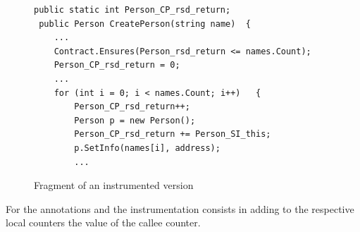 
% 
% 
% 
\begin{figure}[b]
 \begin{scriptsize}
 \begin{lstlisting}[numbers=none]
 public static int Person_CP_rsd_return;
 public Person CreatePerson(string name)  {
 	...
	Contract.Ensures(Person_rsd_return <= names.Count);
 	Person_CP_rsd_return = 0;
 	...		
	for (int i = 0; i < names.Count; i++)	{
		Person_CP_rsd_return++;
		Person p = new Person();
		Person_CP_rsd_return += Person_SI_this;
		p.SetInfo(names[i], address);
		...
 \end{lstlisting}
 \end{scriptsize}
 \vspace{-.5em}
\caption{Fragment of an instrumented version} \label{ex1-inst}
\end{figure}
% 

For the annotations  and  the instrumentation consists in adding to the respective local counters the value of the callee counter. 

